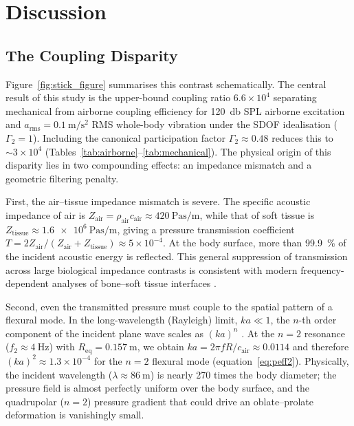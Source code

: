 \section{Discussion}
\label{sec:discussion}

\subsection{The Coupling Disparity}
\label{sec:disc:disparity}



Figure~\ref{fig:stick_figure} summarises this contrast schematically.  The central result of this study is the upper-bound coupling ratio
$6.6 \times 10^4$ separating mechanical from airborne coupling efficiency for
\SI{120}{\decibel} SPL airborne excitation and
$a_\mathrm{rms} = \SI{0.1}{\metre\per\second\squared}$ RMS whole-body
vibration under the SDOF idealisation ($\Gamma_2 = 1$).  Including the
canonical participation factor $\Gamma_2 \approx 0.48$ reduces this to
$\sim 3 \times 10^4$
(Tables~\ref{tab:airborne}--\ref{tab:mechanical}).  The physical origin of
this disparity lies in two compounding effects: an impedance mismatch and a
geometric filtering penalty.

First, the air--tissue impedance mismatch is severe.  The specific acoustic
impedance of air is $Z_{\mathrm{air}} = \rho_{\mathrm{air}} c_{\mathrm{air}}
\approx \SI{420}{\pascal\second\per\metre}$, while that of soft tissue is
$Z_{\mathrm{tissue}} \approx \SI{1.6e6}{\pascal\second\per\metre}$, giving
a pressure transmission coefficient $T = 2Z_{\mathrm{air}} /
(Z_{\mathrm{air}} + Z_{\mathrm{tissue}}) \approx 5 \times 10^{-4}$.  At the
body surface, more than \SI{99.9}{\percent} of the incident acoustic energy is
reflected.  This general suppression of transmission across large biological
impedance contrasts is consistent with modern frequency-dependent analyses of
bone--soft tissue interfaces \cite{Gupta2021}.

Second, even the transmitted pressure must couple to the spatial pattern of
a flexural mode.  In the long-wavelength (Rayleigh) limit, $ka \ll 1$, the
$n$-th order component of the incident plane wave scales as $(ka)^n$
\cite{Junger1986}.  At the $n{=}2$ resonance
($f_2 \approx \SI{4}{\hertz}$) with
$R_{\mathrm{eq}} = \SI{0.157}{\metre}$, we obtain
$ka = 2\pi f R / c_{\mathrm{air}} \approx 0.0114$ and therefore
$(ka)^2 \approx 1.3 \times 10^{-4}$ for the $n = 2$ flexural mode
(equation~\ref{eq:peff2}).  Physically, the incident wavelength
($\lambda \approx \SI{86}{\metre}$) is nearly 270 times the body diameter;
the pressure field is almost perfectly uniform over the body surface, and
the quadrupolar ($n = 2$) pressure gradient that could drive an
oblate--prolate deformation is vanishingly small.

